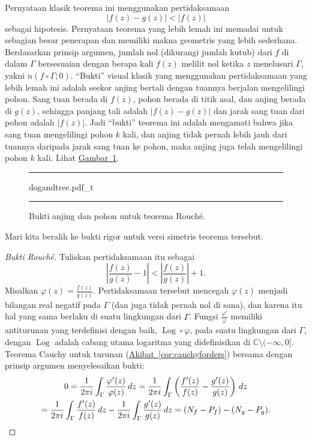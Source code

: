 \documentclass[12pt,openany]{book}
\newcommand{\Log}{\operatorname{Log}}
\newcommand{\sabs}[1]{\lvert {#1} \rvert}
\newcommand{\abs}[1]{\left\lvert {#1} \right\rvert}
\newcommand{\C}{{\mathbb{C}}}
\newcommand{\myquote}[1]{``#1''}
\theoremstyle{plain}
\theoremstyle{remark}
\theoremstyle{definition}
\newenvironment{myfig}{%
\begin{figure}[h!t]
\noindent\rule{\textwidth}{0.5pt}\vspace{12pt}\par\centering}%
{\par\noindent\rule{\textwidth}{0.5pt}
\end{figure}}
\theoremstyle{exercise}
\theoremstyle{example}
\newcommand{\figureref}[1]{\hyperref[#1]{Gambar~\ref*{#1}}}
\newcommand{\corref}[1]{\hyperref[#1]{Akibat~\ref*{#1}}}
\begin{document}
Pernyataan klasik teorema ini menggunakan
pertidaksamaan
\begin{equation*}
\sabs{f(z)-g(z)} < \sabs{f(z)}
\end{equation*}
sebagai hipotesis.
Pernyataan teorema yang lebih lemah ini memadai untuk sebagian besar
penerapan dan memiliki makna geometris yang lebih sederhana.
Berdasarkan prinsip argumen, jumlah nol (dikurangi jumlah kutub) dari $f$
di dalam $\Gamma$ bersesuaian dengan berapa kali $f(z)$ melilit nol
ketika $z$ menelusuri $\Gamma$, yakni $n(f \circ \Gamma;0)$.
\myquote{Bukti} visual klasik yang menggunakan pertidaksamaan yang lebih lemah ini
adalah seekor anjing bertali
dengan tuannya berjalan mengelilingi pohon.  Sang tuan berada di $f(z)$, pohon berada
di titik asal, dan anjing berada di $g(z)$, sehingga panjang tali adalah
$\sabs{f(z)-g(z)}$ dan jarak sang tuan dari pohon adalah
$\sabs{f(z)}$.  Jadi \myquote{bukti} teorema ini adalah mengamati bahwa jika sang
tuan mengelilingi pohon $k$ kali, dan anjing tidak pernah lebih jauh dari
tuannya daripada jarak sang tuan ke pohon, maka anjing juga telah
mengelilingi pohon $k$ kali.  Lihat \figureref{fig:dogandtree}.

\begin{myfig}
{dogandtree.pdf_t}
\caption{Bukti anjing dan pohon untuk teorema Rouch\'e.\label{fig:dogandtree}}
\end{myfig}

Mari kita beralih ke bukti rigor untuk versi simetris
teorema tersebut.

\begin{proof}[Bukti Rouch\'e]
Tuliskan pertidaksamaan itu sebagai
\begin{equation*}
\abs{\frac{f(z)}{g(z)} - 1} <
\abs{\frac{f(z)}{g(z)}} + 1 .
\end{equation*}
Misalkan $\varphi(z) = \frac{f(z)}{g(z)}$.
Pertidaksamaan tersebut mencegah $\varphi(z)$ menjadi bilangan real negatif pada
$\Gamma$ (dan juga tidak pernah nol di sana),
dan karena itu hal yang sama berlaku di suatu lingkungan dari $\Gamma$.
Fungsi
$\frac{\varphi'}{\varphi}$ memiliki antiturunan yang terdefinisi dengan baik,
$\Log \circ \varphi$, pada suatu lingkungan dari $\Gamma$, dengan $\Log$ adalah
cabang utama logaritma yang didefinisikan di $\C \setminus (-\infty,0]$.
Teorema Cauchy untuk turunan (\corref{cor:cauchyforders})
bersama dengan prinsip argumen menyelesaikan bukti:
\begin{multline*}
0
= \frac{1}{2\pi i} \int_{\Gamma} \frac{\varphi'(z)}{\varphi(z)} \, dz
=
\frac{1}{2\pi i} \int_{\Gamma}
\left( \frac{f'(z)}{f(z)} - \frac{g'(z)}{g(z)} \right) \, dz 
\\
=
\frac{1}{2\pi i} \int_{\Gamma}
\frac{f'(z)}{f(z)} \, dz 
-
\frac{1}{2\pi i} \int_{\Gamma}
\frac{g'(z)}{g(z)} \, dz 
=
(N_f - P_f) - (N_g - P_g) .
\qedhere
\end{multline*}
\end{proof}
\end{document}
